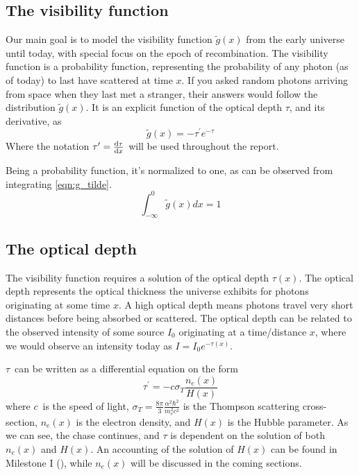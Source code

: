 \documentclass[10pt, a4paper]{article}
\renewcommand{\exp}{e^}
\renewcommand{\exp}{e^}
\begin{document}
\subsection{The visibility function}
Our main goal is to model the visibility function $\tilde{g}(x)$ from the early universe until today, with special focus on the epoch of recombination. The visibility function is a probability function, representing the probability of any photon (as of today) to last have scattered at time $x$. If you asked random photons arriving from space when they last met a stranger, their answers would follow the distribution $\tilde{g}(x)$. It is an explicit function of the optical depth $\tau$, and its derivative, as
\begin{equation}\label{eqn:g_tilde}
    \tilde{g}(x) = -\tau^{\prime} e^{-\tau}
\end{equation}
Where the notation $\tau^\prime = \dv{\tau}{x}$ will be used throughout the report.

Being a probability function, it's normalized to one, as can be observed from integrating \ref{eqn:g_tilde}.
\begin{equation}
    \int_{-\infty}^{0} \tilde{g}(x) d x = 1
\end{equation}


\subsection{The optical depth}
The visibility function requires a solution of the optical depth $\tau(x)$. The optical depth represents the optical thickness the universe exhibits for photons originating at some time $x$. A high optical depth means photons travel very short distances before being absorbed or scattered. The optical depth can be related to the observed intensity of some source $I_0$ originating at a time/distance $x$, where we would observe an intensity today as $I = I_0\exp{-\tau(x)}$.

$\tau$ can be written as a differential equation on the form
\begin{equation}\label{eqn:tau_ODE}
    \tau^\prime = - c \sigma_T\frac{n_{e}(x)}{H(x)}
\end{equation}
where $c$ is the speed of light, $\sigma_T = \frac{8 \pi}{3} \frac{\alpha^{2} \hbar^{2}}{m_{e}^{2} c^{2}}$ is the Thompson scattering cross-section, $n_e(x)$ is the electron density, and $H(x)$ is the Hubble parameter. As we can see, the chase continues, and $\tau$ is dependent on the solution of both $n_e(x)$ and $H(x)$. An accounting of the solution of $H(x)$ can be found in Milestone I (\cite{Milestone1}), while $n_e(x)$ will be discussed in the coming sections.
\end{document}
